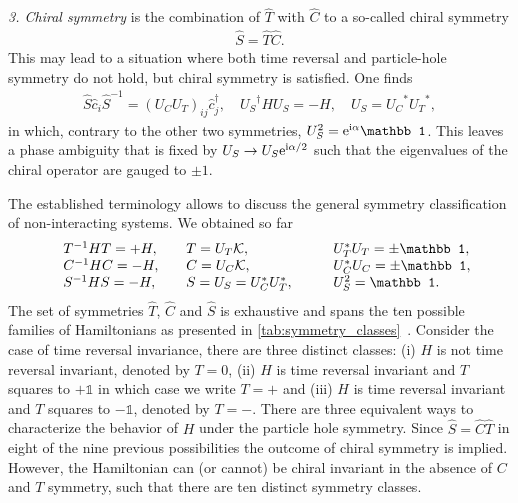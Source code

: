 {\it 3. Chiral symmetry} is the combination of $\hat T$ with $\hat C$ to a so-called chiral symmetry
\begin{align}
    \hat S = \hat T \hat C.
\end{align}
This may lead to a situation where both time reversal and particle-hole symmetry do not hold, but chiral symmetry is satisfied.
One finds
\begin{align}
    \hat S \hat c_i \hat S^{-1} = (U_CU_T)_{ij}\hat c^\dag_j
    ,\quad
    {U_S}^\dag H {U_S} = -H
    ,\quad
    {U_S} = {U_C}^* {U_T}^*
    ,
\end{align}
in which, contrary to the other two symmetries, $U_S^2=\re^{\ri\alpha}\mathbb1$.
This leaves a phase ambiguity that is fixed by $U_S\rightarrow U_S\mathrm e^{\mathrm i\alpha/2}$ such that the eigenvalues of the chiral operator are gauged to $\pm1$.

The established terminology allows to discuss the general symmetry classification of non-interacting systems.
We obtained so far
\begin{align}
    \begin{array}{l l l l }
        & T^{-1}HT = +H
        ,\quad
        & T = U_T\mathcal K
        ,\quad
        & U_T^*U_T = \pm\mathbb1,\\
        & C^{-1}HC = -H
        ,\quad
        & C = U_C\mathcal K
        ,\quad
        & U_C^*U_C = \pm\mathbb1,\\
        & S^{-1}HS = -H
        ,\quad
        & S = U_S = U_C^* U^*_T
        ,\qquad
        & U_S^2 = \mathbb1.
    \end{array}
    \label{eq:symmetry_real_space}
\end{align}
The set of symmetries $\hat T$, $\hat C$ and $\hat S$ is exhaustive and spans the ten possible families of Hamiltonians as presented in \cref{tab:symmetry_classes}~\cite{Chiu2016}.
Consider the case of time reversal invariance, there are three distinct classes:
(i) $H$ is not time reversal invariant, denoted by $T=0$, (ii) $H$ is time reversal invariant and $T$ squares to $+\mathbb1$ in which case we write $T=+$ and (iii) $H$ is time reversal invariant and $T$ squares to $-\mathbb1$, denoted by $T=-$.
There are three equivalent ways to characterize the behavior of $H$ under the particle hole symmetry.
Since $\hat S = \hat C\hat T$ in eight of the nine previous possibilities the outcome of chiral symmetry is implied.
However, the Hamiltonian can (or cannot) be chiral invariant in the absence of $C$ and $T$ symmetry, such that there are ten distinct symmetry classes.


